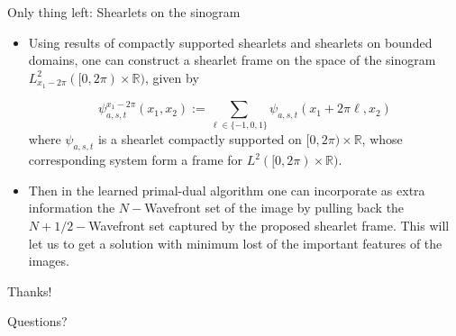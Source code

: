\begin{frame}{Only thing left: Shearlets on the sinogram}
\begin{itemize}
\item Using results of compactly supported shearlets and shearlets on bounded domains, one can construct a shearlet frame on the space of the sinogram $L^2_{x_1-2\pi}([0,2\pi)\times \mathbb{R})$, given by

$$
\psi_{a,s,t}^{x_1-2\pi}(x_1,x_2):=\sum_{\ell\in\{-1,0,1\}}\psi_{a,s,t}(x_1+2\pi\ell,x_2)
$$
where $\psi_{a,s,t}$ is a shearlet compactly supported on $[0,2\pi)\times \mathbb{R}$, whose corresponding system form a frame for $L^2([0,2\pi)\times \mathbb{R})$.

\pause

\item Then in the learned primal-dual algorithm one can incorporate as extra information the $N-$Wavefront set of the image by pulling back the $N+1/2-$Wavefront set captured by the proposed shearlet frame. This will let us to get a solution with minimum lost of the important features of the images.
\end{itemize}
\end{frame}

\begin{frame}{Thanks!}
\begin{center}
\Large{Questions?}
\end{center}
\end{frame}

